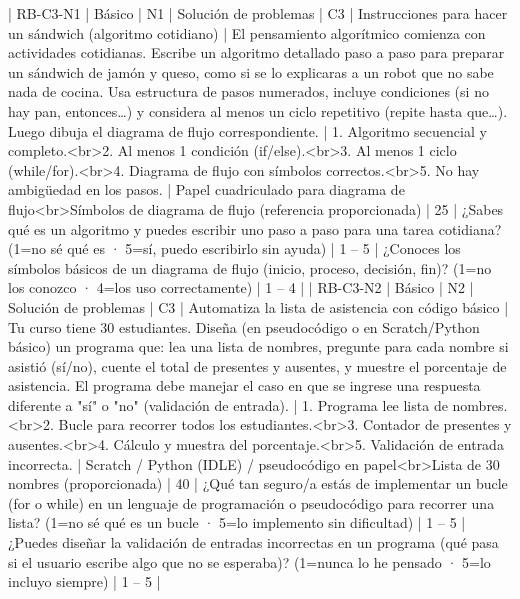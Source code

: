 | RB-C3-N1 | Básico | N1 | Solución de problemas | C3 | Instrucciones para hacer un sándwich (algoritmo cotidiano) | El pensamiento algorítmico comienza con actividades cotidianas. Escribe un algoritmo detallado paso a paso para preparar un sándwich de jamón y queso, como si se lo explicaras a un robot que no sabe nada de cocina. Usa estructura de pasos numerados, incluye condiciones (si no hay pan, entonces…) y considera al menos un ciclo repetitivo (repite hasta que…). Luego dibuja el diagrama de flujo correspondiente. | 1. Algoritmo secuencial y completo.<br>2. Al menos 1 condición (if/else).<br>3. Al menos 1 ciclo (while/for).<br>4. Diagrama de flujo con símbolos correctos.<br>5. No hay ambigüedad en los pasos. | Papel cuadriculado para diagrama de flujo<br>Símbolos de diagrama de flujo (referencia proporcionada) | 25 | ¿Sabes qué es un algoritmo y puedes escribir uno paso a paso para una tarea cotidiana? (1=no sé qué es · 5=sí, puedo escribirlo sin ayuda) | 1 – 5 | ¿Conoces los símbolos básicos de un diagrama de flujo (inicio, proceso, decisión, fin)? (1=no los conozco · 4=los uso correctamente) | 1 – 4 |
| RB-C3-N2 | Básico | N2 | Solución de problemas | C3 | Automatiza la lista de asistencia con código básico | Tu curso tiene 30 estudiantes. Diseña (en pseudocódigo o en Scratch/Python básico) un programa que: lea una lista de nombres, pregunte para cada nombre si asistió (sí/no), cuente el total de presentes y ausentes, y muestre el porcentaje de asistencia. El programa debe manejar el caso en que se ingrese una respuesta diferente a "sí" o "no" (validación de entrada). | 1. Programa lee lista de nombres.<br>2. Bucle para recorrer todos los estudiantes.<br>3. Contador de presentes y ausentes.<br>4. Cálculo y muestra del porcentaje.<br>5. Validación de entrada incorrecta. | Scratch / Python (IDLE) / pseudocódigo en papel<br>Lista de 30 nombres (proporcionada) | 40 | ¿Qué tan seguro/a estás de implementar un bucle (for o while) en un lenguaje de programación o pseudocódigo para recorrer una lista? (1=no sé qué es un bucle · 5=lo implemento sin dificultad) | 1 – 5 | ¿Puedes diseñar la validación de entradas incorrectas en un programa (qué pasa si el usuario escribe algo que no se esperaba)? (1=nunca lo he pensado · 5=lo incluyo siempre) | 1 – 5 |
